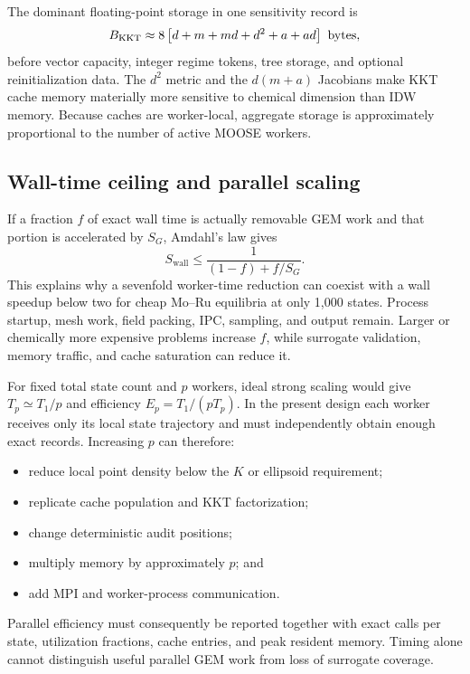 \documentclass[11pt]{article}
\begin{document}
The dominant floating-point storage in one sensitivity record is
\begin{equation}
  B_{\mathrm{KKT}}\approx 8\left[d+m+md+d^2+a+ad\right]\ {\rm bytes},
  \label{eq:kkt-storage}
\end{equation}
before vector capacity, integer regime tokens, tree storage, and optional reinitialization data.
The \(d^2\) metric and the \(d(m+a)\) Jacobians make KKT cache memory materially more sensitive to
chemical dimension than IDW memory.  Because caches are worker-local, aggregate storage is
approximately proportional to the number of active MOOSE workers.

\subsection{Wall-time ceiling and parallel scaling}

If a fraction \(f\) of exact wall time is actually removable GEM work and that portion is
accelerated by \(S_G\), Amdahl's law gives
\begin{equation}
  S_{\mathrm{wall}}\leq
  \frac{1}{(1-f)+f/S_G}.
  \label{eq:amdahl}
\end{equation}
This explains why a sevenfold worker-time reduction can coexist with a wall speedup below two for
cheap Mo--Ru equilibria at only 1,000 states.  Process startup, mesh work, field packing, IPC,
sampling, and output remain.  Larger or chemically more expensive problems increase \(f\), while
surrogate validation, memory traffic, and cache saturation can reduce it.

For fixed total state count and \(p\) workers, ideal strong scaling would give
\(T_p\simeq T_1/p\) and efficiency \(E_p=T_1/(pT_p)\).  In the present design each worker receives
only its local state trajectory and must independently obtain enough exact records.  Increasing
\(p\) can therefore:
\begin{itemize}[leftmargin=*]
  \item reduce local point density below the \(K\) or ellipsoid requirement;
  \item replicate cache population and KKT factorization;
  \item change deterministic audit positions;
  \item multiply memory by approximately \(p\); and
  \item add MPI and worker-process communication.
\end{itemize}
Parallel efficiency must consequently be reported together with exact calls per state, utilization
fractions, cache entries, and peak resident memory.  Timing alone cannot distinguish useful
parallel GEM work from loss of surrogate coverage.
\end{document}
